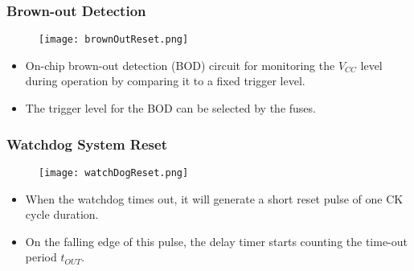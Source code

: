 \subsubsection{Brown-out Detection}
\begin{figure}[H]
    \begin{center}
        \texttt{[image: brownOutReset.png]}
    \end{center}
\end{figure}
\begin{itemize}
    \item On-chip brown-out detection (BOD) circuit for monitoring the $V_{CC}$ level during operation by comparing it to a fixed trigger level.
    \item The trigger level for the BOD can be selected by the  fuses.
\end{itemize}

\subsubsection{Watchdog System Reset}
\begin{figure}[H]
    \begin{center}
        \texttt{[image: watchDogReset.png]}
    \end{center}
\end{figure}
\begin{itemize}
    \item When the watchdog times out, it will generate a short reset pulse of one CK cycle duration.
    \item On the falling edge of this pulse,
    the delay timer starts counting the time-out period $t_{OUT}$.
\end{itemize}


% 